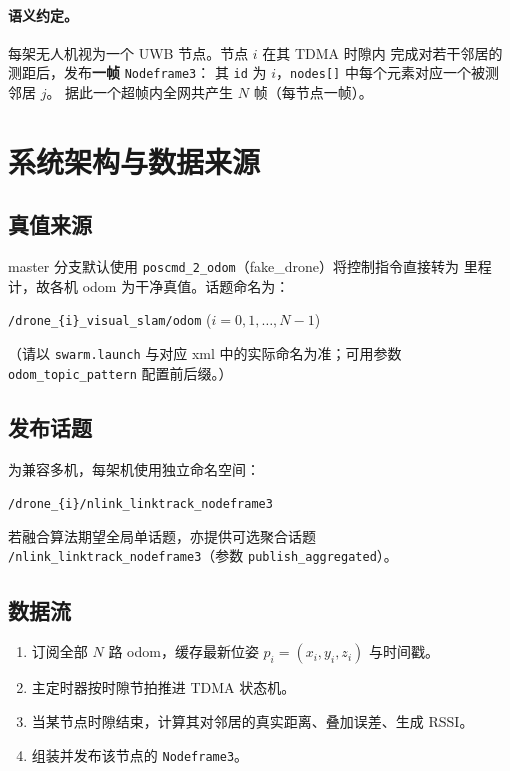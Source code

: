 \documentclass[11pt,a4paper]{article}
\begin{document}
\paragraph{语义约定。}每架无人机视为一个 UWB 节点。节点 $i$ 在其 TDMA 时隙内
完成对若干邻居的测距后，发布\textbf{一帧} \texttt{Nodeframe3}：
其 \texttt{id} 为 $i$，\texttt{nodes[]} 中每个元素对应一个被测邻居 $j$。
据此一个超帧内全网共产生 $N$ 帧（每节点一帧）。

\section{系统架构与数据来源}
\subsection{真值来源}
master 分支默认使用 \texttt{poscmd\_2\_odom}（fake\_drone）将控制指令直接转为
里程计，故各机 odom 为干净真值。话题命名为：
\begin{center}
\texttt{/drone\_\{i\}\_visual\_slam/odom} \quad ($i=0,1,\dots,N-1$)
\end{center}
（请以 \texttt{swarm.launch} 与对应 xml 中的实际命名为准；可用参数
\texttt{odom\_topic\_pattern} 配置前后缀。）

\subsection{发布话题}
为兼容多机，每架机使用独立命名空间：
\begin{center}
\texttt{/drone\_\{i\}/nlink\_linktrack\_nodeframe3}
\end{center}
若融合算法期望全局单话题，亦提供可选聚合话题
\texttt{/nlink\_linktrack\_nodeframe3}（参数 \texttt{publish\_aggregated}）。

\subsection{数据流}
\begin{enumerate}[leftmargin=1.6em]
  \item 订阅全部 $N$ 路 odom，缓存最新位姿 $p_i=(x_i,y_i,z_i)$ 与时间戳。
  \item 主定时器按时隙节拍推进 TDMA 状态机。
  \item 当某节点时隙结束，计算其对邻居的真实距离、叠加误差、生成 RSSI。
  \item 组装并发布该节点的 \texttt{Nodeframe3}。
\end{enumerate}
\end{document}
